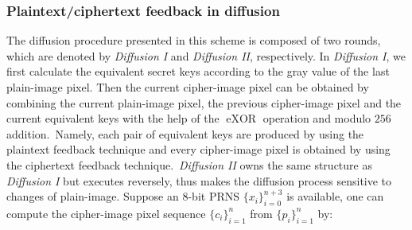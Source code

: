\documentclass[3p,preprint,11pt]{elsarticle}
\DeclareMathOperator{\eXOR}{eXOR}
\begin{document}
\subsubsection{Plaintext/ciphertext feedback in diffusion}
\label{sec:diffusion}


The diffusion procedure presented in this scheme is composed of two rounds,
which are denoted by \textit{Diffusion I} and \textit{Diffusion II}, respectively.
In \textit{Diffusion I}, we first calculate the equivalent secret keys according to the gray value of the last
plain-image pixel. Then the current cipher-image pixel can be obtained by combining the current plain-image pixel, the previous cipher-image pixel and the current equivalent keys with the help of the $\eXOR$ operation and modulo $256$ addition.~Namely, each pair of equivalent keys are produced by using the plaintext feedback technique and
every cipher-image pixel is obtained by using the ciphertext feedback technique.~\textit{Diffusion II}
owns the same structure as \textit{Diffusion I} but executes reversely,
thus makes the diffusion process sensitive to changes of plain-image.
Suppose an $8$-bit PRNS $\{x_i\}_{i=0}^{n+3}$ is available, one can compute the cipher-image
pixel sequence $\{c_i\}_{i=1}^n$ from
$\{p_i\}_{i=1}^n$ by:
\end{document}
